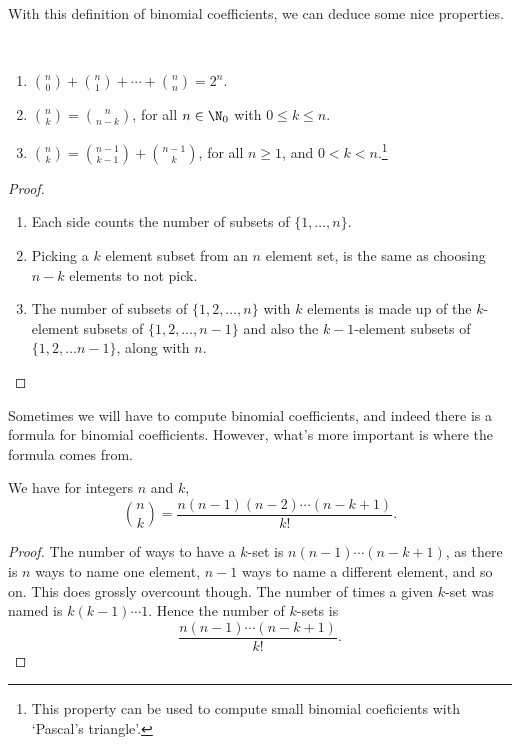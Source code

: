 \documentclass[a4paper]{scrreprt}
\begin{document}
With this definition of binomial coefficients, we can deduce some nice properties.

\begin{proposition}~
	\vspace{-1.5\baselineskip}
	\begin{enumerate}[label=(\roman*)]
	\item $\binom{n}{0} + \binom{n}{1} + \cdots + \binom{n}{n} = 2^n$.
	\item $\binom{n}{k} = \binom{n}{n - k}$, for all $n \in \N_0$ with $0 \leq k \leq n$.
	\item $\binom{n}{k} = \binom{n - 1}{k - 1} + \binom{n - 1}{k}$, for all $n \geq 1$, and $0 < k < n$.\footnote{This property can be used to compute small binomial coeficients with `Pascal's triangle'.}
\end{enumerate}	
\end{proposition}
\begin{proof}
	\begin{enumerate}[label=(\roman*)]
		\item Each side counts the number of subsets of $\{1, \dots, n\}$.
		\item Picking a $k$ element subset from an $n$ element set, is the same as choosing $n - k$ elements to not pick.
		\item The number of subsets of $\{1, 2, \dots, n\}$ with $k$ elements is made up of the $k$-element subsets of $\{1, 2, \dots, n - 1\}$ and also the $k - 1$-element subsets of $\{1, 2, \dots n - 1\}$, along with $n$.
	\end{enumerate}
\end{proof}

Sometimes we will have to compute binomial coefficients, and indeed there is a formula for binomial coefficients. However, what's more important is where the formula comes from.


\begin{proposition}
	We have for integers $n$ and $k$,
	$$
	\binom{n}{k} = \frac{n(n - 1)(n - 2)\cdots (n - k + 1)}{k!}.
	$$
\end{proposition}
\begin{proof}
	The number of ways to have a $k$-set is $n(n - 1)\cdots(n - k + 1)$, as there is $n$ ways to name one element, $n - 1$ ways to name a different element, and so on. This does grossly overcount though. The number of times a given $k$-set was named is $k(k - 1)\cdots 1$. Hence the number of $k$-sets is
	$$
	\frac{n(n - 1)\cdots(n - k + 1)}{k!}.
	$$
\end{proof}
\end{document}
